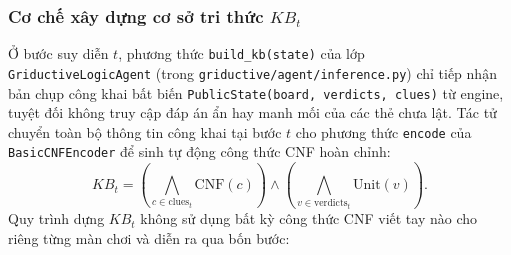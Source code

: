 \documentclass[12pt,a4paper]{article}
\begin{document}
\subsubsection{Cơ chế xây dựng cơ sở tri thức \texorpdfstring{$KB_t$}{KB\_t}}
Ở bước suy diễn $t$, phương thức \texttt{build\_kb(state)} của lớp \texttt{GriductiveLogicAgent} (trong \texttt{griductive/agent/inference.py}) chỉ tiếp nhận bản chụp công khai bất biến \texttt{PublicState(board, verdicts, clues)} từ engine, tuyệt đối không truy cập đáp án ẩn hay manh mối của các thẻ chưa lật. Tác tử chuyển toàn bộ thông tin công khai tại bước $t$ cho phương thức \texttt{encode} của \texttt{BasicCNFEncoder} để sinh tự động công thức CNF hoàn chỉnh:
\[
KB_t = \left(\bigwedge_{c \in \text{clues}_t} \text{CNF}(c)\right) \land \left(\bigwedge_{v \in \text{verdicts}_t} \text{Unit}(v)\right).
\]
Quy trình dựng $KB_t$ không sử dụng bất kỳ công thức CNF viết tay nào cho riêng từng màn chơi và diễn ra qua bốn bước:
\end{document}
